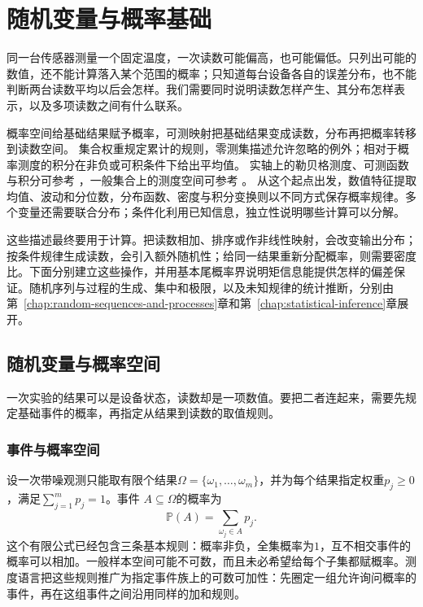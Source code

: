 \chapter{随机变量与概率基础}
\label{chap:random-variables}
\label{chap:probability-theory}

同一台传感器测量一个固定温度，一次读数可能偏高，也可能偏低。只列出可能的数值，还不能计算落入某个范围的概率；只知道每台设备各自的误差分布，也不能判断两台读数平均以后会怎样。我们需要同时说明读数怎样产生、其分布怎样表示，以及多项读数之间有什么联系。

概率空间给基础结果赋予概率，可测映射把基础结果变成读数，分布再把概率转移到读数空间。
集合权重规定累计的规则，零测集描述允许忽略的例外；相对于概率测度的积分在非负或可积条件下给出平均值。
实轴上的勒贝格测度、可测函数与积分可参考
，一般集合上的测度空间可参考
。
从这个起点出发，数值特征提取均值、波动和分位数，分布函数、密度与积分变换则以不同方式保存概率规律。多个变量还需要联合分布；条件化利用已知信息，独立性说明哪些计算可以分解。

这些描述最终要用于计算。把读数相加、排序或作非线性映射，会改变输出分布；按条件规律生成读数，会引入额外随机性；给同一结果重新分配概率，则需要密度比。下面分别建立这些操作，并用基本尾概率界说明矩信息能提供怎样的偏差保证。随机序列与过程的生成、集中和极限，以及未知规律的统计推断，分别由第~\ref{chap:random-sequences-and-processes}章和第~\ref{chap:statistical-inference}章展开。

\section{随机变量与概率空间}
\label{sec:rv-definition}
\label{sec:probability-representation-conditioning}
一次实验的结果可以是设备状态，读数却是一项数值。要把二者连起来，需要先规定基础事件的概率，再指定从结果到读数的取值规则。

\subsection{事件与概率空间}
\label{sec:probability-spaces-random-variables}
设一次带噪观测只能取有限个结果\(\Omega=\{\omega_1,\ldots,\omega_m\}\)，并为每个结果指定权重\(p_j\geq0\)，满足\(\sum_{j=1}^{m}p_j=1\)。事件
\(A\subseteq\Omega\)的概率为
\[ \mathbb{P}(A)=\sum_{\omega_j\in A}p_j. \]
这个有限公式已经包含三条基本规则：概率非负，全集概率为\(1\)，互不相交事件的概率可以相加。一般样本空间可能不可数，而且未必希望给每个子集都赋概率。测度语言把这些规则推广为指定事件族上的可数可加性：先圈定一组允许询问概率的事件，再在这组事件之间沿用同样的加和规则。

